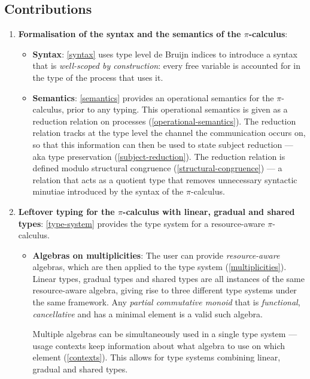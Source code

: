 \documentclass[a4paper,UKenglish,cleveref,autoref,thm-restate,authorcolumns]{lipics-v2019}
\theoremstyle{definition}
\newcommand{\picalc}{$\pi$-calculus}
\begin{document}
\subsection{Contributions}
\begin{enumerate}
\item \textbf{Formalisation of the syntax and the semantics of the \picalc{}}:
 \begin{itemize}
   \item \textbf{Syntax}: \autoref{syntax} uses type level de Bruijn indices \cite{deBruijn1972} to introduce a syntax that is \emph{well-scoped by construction}: every free variable is accounted for in the type of the process that uses it.
   
   \item \textbf{Semantics}: \autoref{semantics} provides an operational semantics for the \picalc{}, prior to any typing.
   This operational semantics is given as a reduction relation on processes (\autoref{operational-semantics}).
   The reduction relation tracks at the type level the channel the communication occurs on, so that this information can then be used to state subject reduction --- aka type preservation (\autoref{subject-reduction}).
   The reduction relation is defined modulo structural congruence (\autoref{structural-congruence}) --- a relation that acts as a quotient type that removes unnecessary syntactic minutiae introduced by the syntax of the \picalc{}.
 \end{itemize}
  
  \item \textbf{Leftover typing for the \picalc{} with linear, gradual and shared types}:
  \autoref{type-system} provides the type system for a resource-aware \picalc{}.
  \begin{itemize}
    \item \textbf{Algebras on multiplicities}: The user can provide \emph{resource-aware} algebras, which are then applied to the type system (\autoref{multiplicities}).
    Linear types, gradual types and shared types are all instances of the same resource-aware algebra, giving rise to three different type systems under the same framework.
    Any \emph{partial commutative monoid} that is \emph{functional}, \emph{cancellative} and has a minimal element is a valid such algebra.
    
    Multiple algebras can be simultaneously used in a single type system --- usage contexts keep information about what algebra to use on which element (\autoref{contexts}).
    This allows for type systems combining linear, gradual and shared types.
    

\end{itemize}
\end{enumerate}
\end{document}
